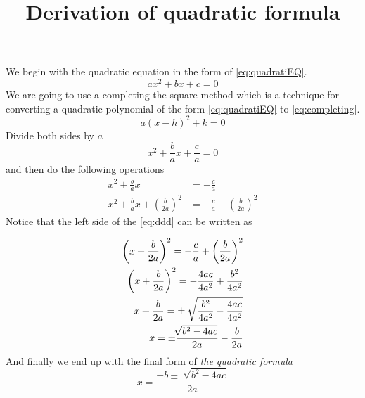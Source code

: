 \documentclass[12pt]{article}
\begin{document}
\date{\vspace{-7ex}}
\title{Derivation of quadratic formula}
\maketitle
We begin with the quadratic equation in the form of \eqref{eq:quadratiEQ}.
\begin{equation} \label{eq:quadratiEQ}
  ax^2+bx+c=0
\end{equation}
We are going to use a completing the square method which is a technique for converting
a quadratic polynomial of the form \eqref{eq:quadratiEQ} to \eqref{eq:completing}.
\begin{equation} \label{eq:completing}
  a(x-h)^2+k=0
\end{equation}
Divide both sides by $a$
\begin{equation}
  x^2+\frac{b}{a}x+\frac{c}{a}=0
\end{equation}
and then do the following operations
\begin{align}
  x^2+\frac{b}{a}x                             & =-\frac{c}{a}                                            \\
  x^2+\frac{b}{a}x+\left(\frac{b}{2a}\right)^2 & =-\frac{c}{a}+\left(\frac{b}{2a}\right)^2 \label{eq:ddd}
\end{align}
Notice that the left side of the \eqref{eq:ddd} can be written as

\begin{eqnarray}
  \left(x+\frac{b}{2a}\right)^2 =-\frac{c}{a}+\left(\frac{b}{2a}\right)^2 \\
  \left(x+\frac{b}{2a}\right)^2 = -\frac{4ac}{4a^2}+\frac{b^2}{4a^2} \\
  x+\frac{b}{2a} = \pm \hspace{0.5em}\sqrt[]{\frac{b^2}{4a^2}-\frac{4ac}{4a^2}} \\
  x = \pm \frac{\sqrt[]{b^2-4ac}}{2a} - \frac{b}{2a}
\end{eqnarray}
And finally we end up with the final form of \textit{the quadratic formula}
\begin{equation}
  x = \frac{-b \pm \sqrt[]{b^2-4ac}}{2a}
\end{equation}
\end{document}
